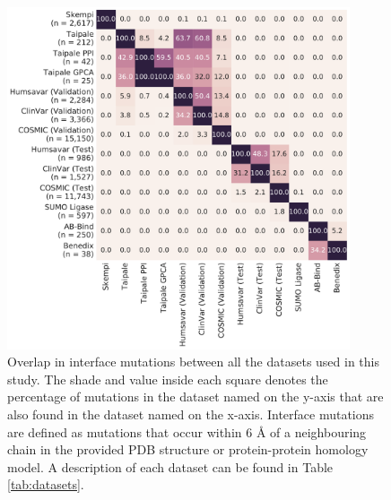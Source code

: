 \begin{figure}[tb]
	\centering
	\includegraphics[width=0.9\textwidth]{static/elaspic_training_set/data_statistics/training_set_overlap_data_df_tt_interface.pdf}
	\caption[Overlap in interface mutation datasets.]{
		Overlap in interface mutations between all the datasets used in this study.
		The shade and value inside each square denotes the percentage of mutations in the dataset named on the y-axis that are also found in the dataset named on the x-axis.
		Interface mutations are defined as mutations that occur within 6 {\AA} of a neighbouring chain in the provided PDB structure or protein-protein homology model.
		A description of each dataset can be found in Table \ref{tab:datasets}.
	}
	\label{fig:training_set_overlap_interface}
\end{figure}
